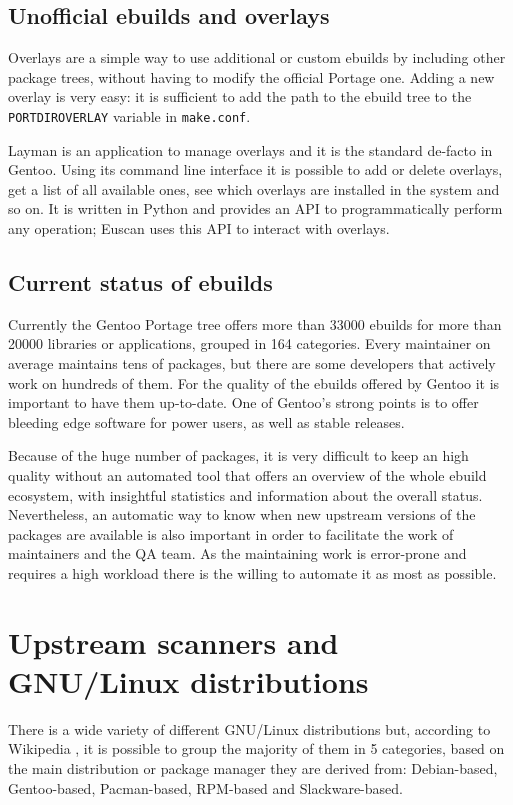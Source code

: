 \subsection{Unofficial ebuilds and overlays}
Overlays are a simple way to use additional or custom ebuilds by including other package trees, without having to modify the official Portage one. Adding a new overlay is very easy: it is sufficient to add the path to the ebuild tree to the \texttt{PORTDIR\textunderscore OVERLAY} variable in \texttt{make.conf}.

Layman is an application to manage overlays and it is the standard de-facto in Gentoo. Using its command line interface it is possible to add or delete overlays, get a list of all available ones, see which overlays are installed in the system and so on. It is written in Python and provides an API to programmatically perform any operation; Euscan uses this API to interact with overlays.


\subsection{Current status of ebuilds}
Currently the Gentoo Portage tree offers more than 33000 ebuilds for more than 20000 libraries or applications, grouped in 164 categories.
Every maintainer on average maintains tens of packages, but there are some developers that actively work on hundreds of them. For the quality of the ebuilds offered by Gentoo it is important to have them up-to-date. One of Gentoo's strong points is to offer bleeding edge software for power users, as well as stable releases.

Because of the huge number of packages, it is very difficult to keep an high quality without an automated tool that offers an overview of the whole ebuild ecosystem, with insightful statistics and information about the overall status. Nevertheless, an automatic way to know when new upstream versions of the packages are available is also important in order to facilitate the work of maintainers and the QA team.
As the maintaining work is error-prone and requires a high workload there is the willing to automate it as most as possible.


\section{Upstream scanners and GNU/Linux distributions}
There is a wide variety of different GNU/Linux distributions but, according to Wikipedia \cite{wikipedia_distros}, it is possible to group the majority of them in 5 categories, based on the main distribution or package manager they are derived from: Debian-based, Gentoo-based, Pacman-based, RPM-based and Slackware-based.

